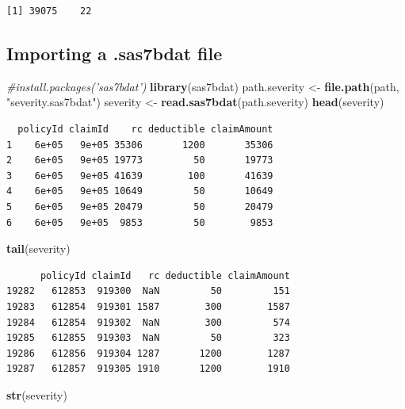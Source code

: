 \documentclass[
]{book}
\newenvironment{Shaded}{\begin{snugshade}}{\end{snugshade}}
\newcommand{\CommentTok}[1]{\textcolor[rgb]{0.56,0.35,0.01}{\textit{#1}}}
\newcommand{\KeywordTok}[1]{\textcolor[rgb]{0.13,0.29,0.53}{\textbf{#1}}}
\newcommand{\NormalTok}[1]{#1}
\newcommand{\StringTok}[1]{\textcolor[rgb]{0.31,0.60,0.02}{#1}}
\begin{document}
\begin{verbatim}
[1] 39075    22
\end{verbatim}

\hypertarget{importing-a-.sas7bdat-file}{%
\subsection{Importing a .sas7bdat file}\label{importing-a-.sas7bdat-file}}

\begin{Shaded}
\begin{Highlighting}[]
\CommentTok{#install.packages('sas7bdat')}
\KeywordTok{library}\NormalTok{(sas7bdat)}
\NormalTok{path.severity <-}\StringTok{ }\KeywordTok{file.path}\NormalTok{(path, }\StringTok{"severity.sas7bdat"}\NormalTok{)}
\NormalTok{severity <-}\StringTok{ }\KeywordTok{read.sas7bdat}\NormalTok{(path.severity)}
\KeywordTok{head}\NormalTok{(severity)}
\end{Highlighting}
\end{Shaded}

\begin{verbatim}
  policyId claimId    rc deductible claimAmount
1    6e+05   9e+05 35306       1200       35306
2    6e+05   9e+05 19773         50       19773
3    6e+05   9e+05 41639        100       41639
4    6e+05   9e+05 10649         50       10649
5    6e+05   9e+05 20479         50       20479
6    6e+05   9e+05  9853         50        9853
\end{verbatim}

\begin{Shaded}
\begin{Highlighting}[]
\KeywordTok{tail}\NormalTok{(severity)}
\end{Highlighting}
\end{Shaded}

\begin{verbatim}
      policyId claimId   rc deductible claimAmount
19282   612853  919300  NaN         50         151
19283   612854  919301 1587        300        1587
19284   612854  919302  NaN        300         574
19285   612855  919303  NaN         50         323
19286   612856  919304 1287       1200        1287
19287   612857  919305 1910       1200        1910
\end{verbatim}

\begin{Shaded}
\begin{Highlighting}[]
\KeywordTok{str}\NormalTok{(severity)}
\end{Highlighting}
\end{Shaded}
\end{document}
